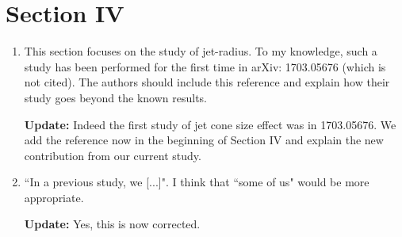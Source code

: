 \documentclass[12pt]{article}
\begin{document}
\section*{Section IV}
\begin{enumerate}
\item This section focuses on the study of jet-radius. To my knowledge, such a study has been performed for the first time in arXiv: 1703.05676 (which is not cited). The authors should include this reference and explain how their study goes beyond the known results.

{\bf Update:} Indeed the first study of jet cone size effect was in 1703.05676. We add the reference now in the beginning of Section IV and explain the new contribution from our current study.

\item ``In a previous study, we [...]". I think that ``some of us" would be more appropriate.

{\bf Update:} Yes, this is now corrected.

\end{enumerate}
\end{document}
